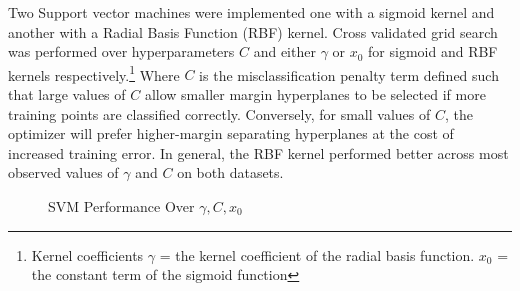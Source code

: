 \documentclass[12pt]{article}
\begin{document}
Two Support vector machines were implemented one with a sigmoid kernel and another with a Radial Basis Function (RBF) kernel. Cross validated grid search was performed over hyperparameters $C$ and either $\gamma$ or $x_0$ for sigmoid and RBF kernels respectively.\footnote{Kernel coefficients $\gamma$ = the kernel coefficient of the radial basis function. $x_0$ = the constant term of the sigmoid function} Where $C$ is the misclassification penalty term defined such that large values of $C$ allow smaller margin hyperplanes to be selected if more training points are classified correctly. Conversely, for small values of $C$, the optimizer will prefer higher-margin separating hyperplanes at the cost of increased training error. In general, the RBF kernel performed better across most observed values of $\gamma$ and $C$ on both datasets.

\begin{figure}%
    \centering
    \qquad
    \caption{SVM Performance Over $\gamma, C, x_0$}
    \label{fig:svm}%
\end{figure}
\end{document}
